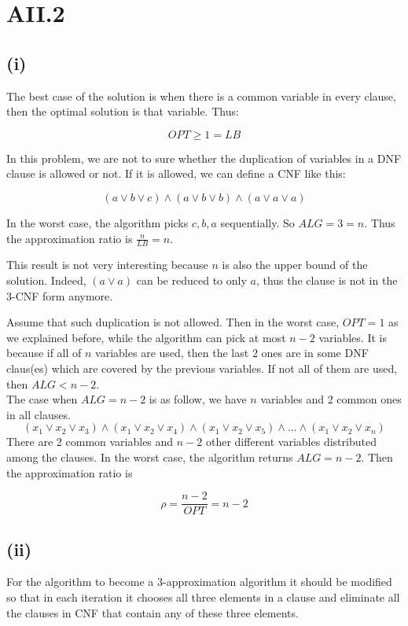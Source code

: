 \section* {AII.2}
\label {a2-2}
\subsection*{(i)}

The best case of the solution is when there is a common variable in every clause, then the optimal solution is that variable. Thus:

$$ OPT \ge 1 = LB $$

In this problem, we are not to sure whether the duplication of variables in a DNF clause is allowed or not. If it is allowed, we can define a CNF like this:

$$(a \vee b \vee c) \wedge (a \vee b \vee b) \wedge (a \vee a \vee a) $$

In the worst case, the algorithm picks $c, b, a$ sequentially. So $ALG = 3 = n$. Thus the approximation ratio is $\frac{n}{LB} = n$.

This result is not very interesting because $n$ is also the upper bound of the solution. Indeed, $(a \vee a)$ can be reduced to only $a$, thus the clause is not in the 3-CNF form anymore.

Assume that such duplication is not allowed. Then in the worst case, $OPT = 1$ as we explained before, while the algorithm can pick at most $n-2$ variables. It is because if all of $n$ variables are used, then the last 2 ones are in some DNF claus(es) which are covered by the previous variables. If not all of them are used, then $ALG < n-2$. \\

The case when $ALG = n - 2$ is as follow, we have $n$ variables and 2 common ones in all clauses.
$$ (x_1 \vee x_2  \vee x_3) \wedge (x_1 \vee x_2 \vee x_4) \wedge (x_1 \vee x_2 \vee x_5) \wedge ... \wedge (x_1 \vee x_2 \vee x_n) $$
There are 2 common variables and $n-2$ other different variables distributed among the clauses. In the worst case, the algorithm returns $ALG = n-2 $. Then the approximation ratio is

$$\rho = \frac{n-2}{OPT} = n-2$$

\subsection*{(ii)}
For the algorithm to become a 3-approximation algorithm it should be modified so that in each iteration it chooses all three elements in a clause and eliminate all the clauses in CNF that contain any of these three elements.\\

